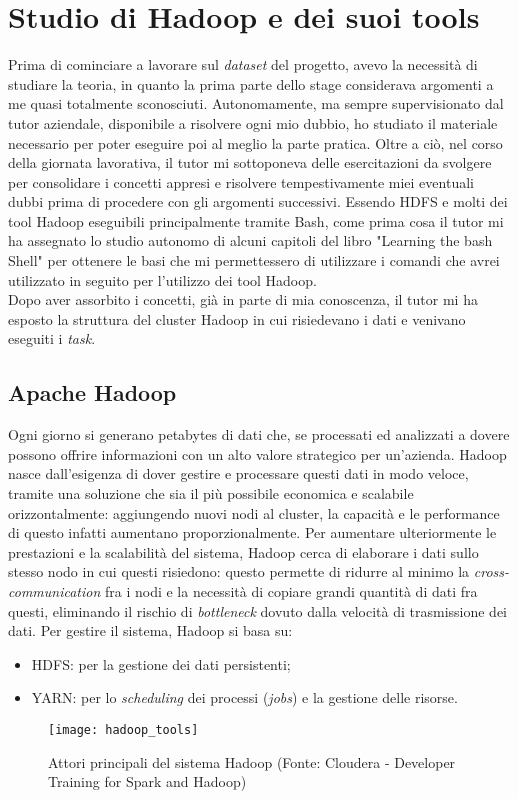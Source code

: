 
\section{Studio di Hadoop e dei suoi tools}
Prima di cominciare a lavorare sul \textit{dataset} del progetto, avevo la necessità di studiare la teoria, in quanto la prima parte dello stage considerava argomenti a me quasi totalmente sconosciuti.
Autonomamente, ma sempre supervisionato dal tutor aziendale, disponibile a risolvere ogni mio dubbio, ho studiato il materiale necessario per poter eseguire poi al meglio la parte pratica. Oltre a ciò, nel corso della giornata lavorativa, il tutor mi sottoponeva delle esercitazioni da svolgere per consolidare i concetti appresi e risolvere tempestivamente miei eventuali dubbi prima di procedere con gli argomenti successivi.
Essendo \gls{HDFS} e molti dei tool Hadoop eseguibili principalmente tramite \gls{Bash}, come prima cosa il tutor mi ha assegnato lo studio autonomo di alcuni capitoli del libro "Learning the bash Shell" per ottenere le basi che mi permettessero di utilizzare i comandi che avrei utilizzato in seguito per l'utilizzo dei tool Hadoop.\\
Dopo aver assorbito i concetti, già in parte di mia conoscenza, il tutor mi ha esposto la struttura del \gls{cluster} Hadoop in cui risiedevano i dati e venivano eseguiti i \textit{task}. 

\subsection{Apache Hadoop}
Ogni giorno si generano petabytes di dati che, se processati ed analizzati a dovere possono offrire informazioni con un alto valore strategico per un'azienda. Hadoop nasce dall'esigenza di dover gestire e processare questi dati in modo veloce, tramite una soluzione che sia il più possibile economica e scalabile orizzontalmente: aggiungendo nuovi nodi al \gls{cluster}, la capacità e le performance di questo infatti aumentano proporzionalmente. Per aumentare ulteriormente le prestazioni e la scalabilità del sistema, Hadoop cerca di elaborare i dati sullo stesso nodo in cui questi risiedono: questo permette di ridurre al minimo la \textit{cross-communication} fra i nodi e la necessità di copiare grandi quantità di dati fra questi, eliminando il rischio di \textit{bottleneck} dovuto dalla velocità di trasmissione dei dati. Per gestire il sistema, Hadoop si basa su:
\begin{itemize}
	\item \gls{HDFS}: per la gestione dei dati persistenti;
	\item YARN: per lo \textit{scheduling} dei processi (\textit{jobs}) e la gestione delle risorse.
\end{itemize}
\begin{figure}[!h]
	\centering 
	\texttt{[image: hadoop\_tools]}
	\caption{Attori principali del sistema Hadoop (Fonte: Cloudera - Developer Training for Spark and Hadoop)}
\end{figure}
